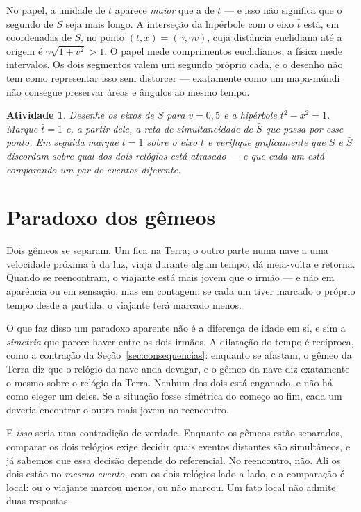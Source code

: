 \documentclass[12pt,a4paper,oneside]{book}
\theoremstyle{rgplain}
\newtheorem{activity}{Atividade}[chapter]
\theoremstyle{rgremark}
\begin{document}
\begin{atencao}
No papel, a unidade de $\bar t$ aparece \emph{maior} que a de $t$ --- e isso não
significa que o segundo de $\bar S$ seja mais longo. A interseção da hipérbole com
o eixo $\bar t$ está, em coordenadas de $S$, no ponto $(t,x)=(\gamma,\gamma v)$,
cuja distância euclidiana até a origem é $\gamma\sqrt{1+v^2}>1$. O papel mede
comprimentos euclidianos; a física mede intervalos. Os dois segmentos valem um
segundo próprio cada, e o desenho não tem como representar isso sem distorcer
--- exatamente como um mapa-múndi não consegue preservar áreas e ângulos ao
mesmo tempo.
\end{atencao}

\begin{activity}
Desenhe os eixos de $\bar S$ para $v=0{,}5$ e a hipérbole $t^2-x^2=1$. Marque
$\bar t=1$ e, a partir dele, a reta de simultaneidade de $\bar S$ que passa por esse
ponto. Em seguida marque $t=1$ sobre o eixo $t$ e verifique graficamente que
$S$ e $\bar S$ discordam sobre qual dos dois relógios está atrasado --- e que cada
um está comparando um par de eventos diferente.
\end{activity}

\section{Paradoxo dos gêmeos}

Dois gêmeos se separam. Um fica na Terra; o outro parte numa nave a uma
velocidade próxima à da luz, viaja durante algum tempo, dá meia-volta e
retorna. Quando se reencontram, o viajante está mais jovem que o irmão --- e
não em aparência ou em sensação, mas em contagem: se cada um tiver marcado o
próprio tempo desde a partida, o viajante terá marcado menos.

O que faz disso um paradoxo aparente não é a diferença de idade em si, e sim a
\emph{simetria} que parece haver entre os dois irmãos. A dilatação do tempo é
recíproca, como a contração da Seção~\ref{sec:consequencias}: enquanto se
afastam, o gêmeo da Terra diz que o relógio da nave anda devagar, e o gêmeo da
nave diz exatamente o mesmo sobre o relógio da Terra. Nenhum dos dois está
enganado, e não há como eleger um deles. Se a situação fosse simétrica do
começo ao fim, cada um deveria encontrar o outro mais jovem no reencontro.

E \emph{isso} seria uma contradição de verdade. Enquanto os gêmeos estão
separados, comparar os dois relógios exige decidir quais eventos distantes são
simultâneos, e já sabemos que essa decisão depende do referencial. No
reencontro, não. Ali
os dois estão no \emph{mesmo evento}, com os dois relógios lado a lado, e a
comparação é local: ou o viajante marcou menos, ou não marcou. Um fato local
não admite duas respostas.
\end{document}
